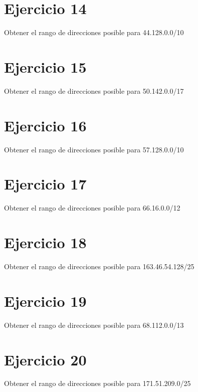\documentclass[letterpaper,10pt,spanish]{sphinxmanual}
\begin{document}
\section{Ejercicio 14}
\label{\detokenize{t2_integracion_elementos/ejercicios_subredes_ipv4/rangos_direcciones:ejercicio-14}}
\sphinxAtStartPar
Obtener el rango de direcciones posible para 44.128.0.0/10


\section{Ejercicio 15}
\label{\detokenize{t2_integracion_elementos/ejercicios_subredes_ipv4/rangos_direcciones:ejercicio-15}}
\sphinxAtStartPar
Obtener el rango de direcciones posible para 50.142.0.0/17


\section{Ejercicio 16}
\label{\detokenize{t2_integracion_elementos/ejercicios_subredes_ipv4/rangos_direcciones:ejercicio-16}}
\sphinxAtStartPar
Obtener el rango de direcciones posible para 57.128.0.0/10


\section{Ejercicio 17}
\label{\detokenize{t2_integracion_elementos/ejercicios_subredes_ipv4/rangos_direcciones:ejercicio-17}}
\sphinxAtStartPar
Obtener el rango de direcciones posible para 66.16.0.0/12


\section{Ejercicio 18}
\label{\detokenize{t2_integracion_elementos/ejercicios_subredes_ipv4/rangos_direcciones:ejercicio-18}}
\sphinxAtStartPar
Obtener el rango de direcciones posible para 163.46.54.128/25


\section{Ejercicio 19}
\label{\detokenize{t2_integracion_elementos/ejercicios_subredes_ipv4/rangos_direcciones:ejercicio-19}}
\sphinxAtStartPar
Obtener el rango de direcciones posible para 68.112.0.0/13


\section{Ejercicio 20}
\label{\detokenize{t2_integracion_elementos/ejercicios_subredes_ipv4/rangos_direcciones:ejercicio-20}}
\sphinxAtStartPar
Obtener el rango de direcciones posible para 171.51.209.0/25
\end{document}
